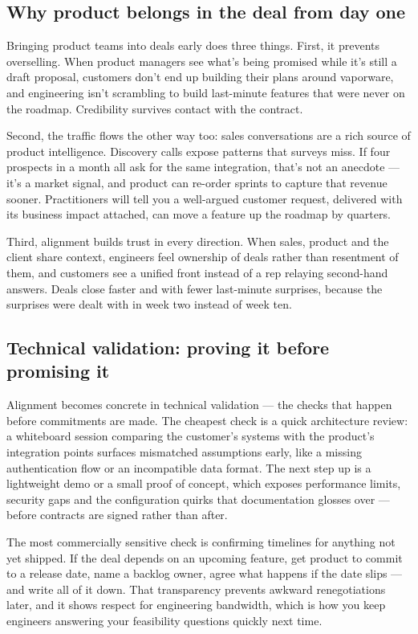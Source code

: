 \subsection{Why product belongs in the deal from day one}


Bringing product teams into deals early does three things. First, it prevents overselling. When product managers see what's being promised while it's still a draft proposal, customers don't end up building their plans around vaporware, and engineering isn't scrambling to build last-minute features that were never on the roadmap. Credibility survives contact with the contract.


Second, the traffic flows the other way too: sales conversations are a rich source of product intelligence. Discovery calls expose patterns that surveys miss. If four prospects in a month all ask for the same integration, that's not an anecdote — it's a market signal, and product can re-order sprints to capture that revenue sooner. Practitioners will tell you a well-argued customer request, delivered with its business impact attached, can move a feature up the roadmap by quarters.


Third, alignment builds trust in every direction. When sales, product and the client share context, engineers feel ownership of deals rather than resentment of them, and customers see a unified front instead of a rep relaying second-hand answers. Deals close faster and with fewer last-minute surprises, because the surprises were dealt with in week two instead of week ten.



\subsection{Technical validation: proving it before promising it}


Alignment becomes concrete in technical validation — the checks that happen before commitments are made. The cheapest check is a quick architecture review: a whiteboard session comparing the customer's systems with the product's integration points surfaces mismatched assumptions early, like a missing authentication flow or an incompatible data format. The next step up is a lightweight demo or a small proof of concept, which exposes performance limits, security gaps and the configuration quirks that documentation glosses over — before contracts are signed rather than after.


The most commercially sensitive check is confirming timelines for anything not yet shipped. If the deal depends on an upcoming feature, get product to commit to a release date, name a backlog owner, agree what happens if the date slips — and write all of it down. That transparency prevents awkward renegotiations later, and it shows respect for engineering bandwidth, which is how you keep engineers answering your feasibility questions quickly next time.


